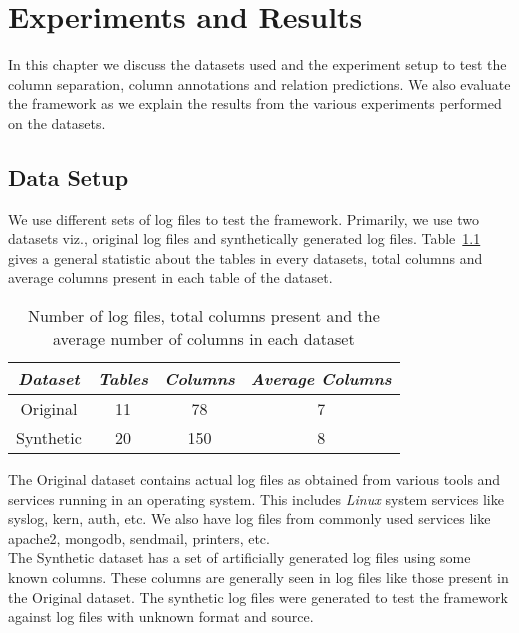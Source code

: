 \chapter{Experiments and Results}
\thispagestyle{plain}
\label {Experiments and Results}

In this chapter we discuss the datasets used and the experiment setup to test the column separation, column annotations and relation predictions. We also evaluate the framework as we explain the results from the various experiments performed on the datasets.


\section{Data Setup}
We use different sets of log files to test the framework. Primarily, we use two datasets viz., original log files and synthetically generated log files. Table~\ref{table:dataset_distribution} gives a general statistic about the tables in every datasets, total columns and average columns present in each table of the dataset.

\begin{table}[htbp]
\caption{Number of log files, total columns present and the average number of columns in each dataset}
\bigskip
\label{table:dataset_distribution}
\centering
\begin{center}
\def\arraystretch{1.8}
\begin{tabular}{|@{\hskip 1cm}c@{\hskip 1cm}|c|c|c|}
\hline
\textit{Dataset} & \textit{Tables} & \textit{Columns} & \textit{Average Columns}\\ 
\hline
Original & 11 & 78 & 7\\
\hline
Synthetic & 20 & 150 & 8\\ 
\hline
\end{tabular}
\end{center}
\end{table}

The Original dataset contains actual log files as obtained from various tools and services running in an operating system. This includes \textit{Linux} system services like syslog, kern, auth, etc. We also have log files from commonly used services like apache2, mongodb, sendmail, printers, etc.
\\

The Synthetic dataset has a set of artificially generated log files using some known columns. These columns are generally seen in log files like those present in the Original dataset. The synthetic log files were generated to test the framework against log files with unknown format and source.

